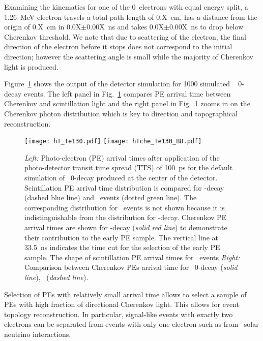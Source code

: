 Examining the kinematics for one of the 0\nbb~electrons with equal energy split, a 1.26~MeV electron travels a total path length of 0.X~cm, 
has a distance from the origin of 0.X~cm in 0.0X$\pm$0.00X~ns  and takes 0.0X$\pm$0.00X~ns to drop below Cherenkov threshold. 
We note that due to scattering of the electron, the final direction of the electron before it stops does not correspond to the initial 
direction; however the scattering angle is small while the majority of Cherenkov light is produced.

Figure~\ref{fig:ArrivalTimeDist} shows the output of the detector simulation for 1000 simulated \Te~ 0\nbb-decay 
events. The left panel in Fig.~\ref{fig:ArrivalTimeDist} compares PE arrival time between Cherenkov and scintillation light  
and the right panel in Fig.~\ref{fig:ArrivalTimeDist} zooms in on the Cherenkov photon distribution which is key to direction and 
topographical reconstruction.


\begin{figure}[ht]
  \centering
  \texttt{[image: hT\_Te130.pdf]}
  \texttt{[image: hTche\_Te130\_B8.pdf]}
  \caption{\emph{Left:} Photo-electron (PE) arrival times after
    application of the photo-detector transit time spread (TTS) of 100~ps for the default simulation 
    of \Te~0\nbb-decay produced at the center of the detector. 
    Scintillation PE arrival time distribution is compared for \nbb-decay (dashed blue line) and
    \Cten~events (dotted green line). The corresponding distribution for \B~events is not shown
    because it is indistinguishable from the distribution for \nbb-decay. Cherenkov PE arrival
    times are shown for \nbb-decay (\emph{solid red line}) to demonstrate their contribution to the early PE sample.
    The vertical line at 33.5~ns indicates the time cut for the selection of the early PE sample.
    The shape of scintillation PE arrival times for \B~events
    \emph{Right:} Comparison between Cherenkov PEs arrival time for \Te~0\nbb-decay (\emph{solid line}), 
    \B~(\emph{dashed line}).}
\label{fig:ArrivalTimeDist}
\end{figure}


Selection of PEs with relatively small arrival time allows to select a sample of PEs with high fraction of directional Cherenkov light.
This allows for event topology reconstruction. In particular, signal-like events with exactly two electrons can be separated from events 
with only one electron such as from \B~solar neutrino interactions.

